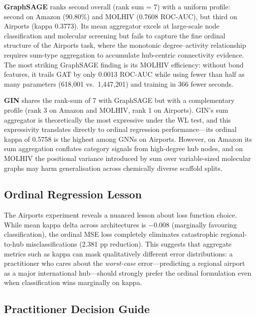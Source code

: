 \textbf{GraphSAGE} ranks second overall (rank sum = 7) with a uniform profile: second on Amazon (90.80\%) and MOLHIV (0.7608 ROC-AUC), but third on Airports (kappa 0.3773). Its mean aggregator excels at large-scale node classification and molecular screening but fails to capture the fine ordinal structure of the Airports task, where the monotonic degree--activity relationship requires sum-type aggregation to accumulate hub-centric connectivity evidence. The most striking GraphSAGE finding is its MOLHIV efficiency: without bond features, it trails GAT by only 0.0013 ROC-AUC while using fewer than half as many parameters (618,001 vs.\ 1,447,201) and training in 366 fewer seconds.

\textbf{GIN} shares the rank-sum of 7 with GraphSAGE but with a complementary profile (rank 3 on Amazon and MOLHIV, rank 1 on Airports). GIN's sum aggregator is theoretically the most expressive under the WL test, and this expressivity translates directly to ordinal regression performance---its ordinal kappa of 0.5758 is the highest among GNNs on Airports. However, on Amazon its sum aggregation conflates category signals from high-degree hub nodes, and on MOLHIV the positional variance introduced by sum over variable-sized molecular graphs may harm generalisation across chemically diverse scaffold splits.

\subsection{Ordinal Regression Lesson}

The Airports experiment reveals a nuanced lesson about loss function choice. While mean kappa delta across architectures is $-0.008$ (marginally favouring classification), the ordinal MSE loss completely eliminates catastrophic regional-to-hub misclassifications (2.381 pp reduction). This suggests that aggregate metrics such as kappa can mask qualitatively different error distributions: a practitioner who cares about the \emph{worst-case} error---predicting a regional airport as a major international hub---should strongly prefer the ordinal formulation even when classification wins marginally on kappa.

\subsection{Practitioner Decision Guide}

